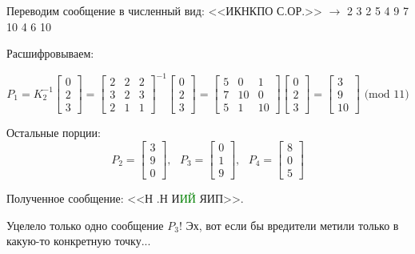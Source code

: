 \documentclass[a4paper,hidelinks,14pt]{extarticle}
\begin{document}
	Переводим сообщение в численный вид: <<ИКНКПО С.ОР.>> $\rightarrow$  2 3 2 5 4 9 7 10 4 6 10
	
	Расшифровываем:
	
		$$
	P_1 = K_2^{-1}\begin{bmatrix}
		0 \\
		2 \\
		3
	\end{bmatrix} =
	\begin{bmatrix}
		2 & 2 & 2 \\
		3 & 2 & 3 \\
		2 & 1 & 1
	\end{bmatrix}^{-1}
	\begin{bmatrix}
		0 \\
		2 \\
		3
	\end{bmatrix}
	=
	\begin{bmatrix}
		5 & 0 & 1 \\
		7 & 10 & 0 \\
		5 & 1  & 10
	\end{bmatrix}
	\begin{bmatrix}
		0 \\
		2 \\
		3
	\end{bmatrix}
	=
	\begin{bmatrix}
		3 \\
		9 \\
		10
	\end{bmatrix} \text{ (mod 11)}
	$$
	
	Остальные порции:
	$$
		P_2 = \begin{bmatrix}
			3 \\
			9 \\
			0
		\end{bmatrix}, \text{ }
		P_3 = \begin{bmatrix}
			0 \\
			1 \\
			9
		\end{bmatrix}, \text{ }
		P_4 = \begin{bmatrix}
			8 \\
			0 \\
			5
		\end{bmatrix}
	$$
	
	Полученное сообщение: <<Н .Н И\textcolor{green}{ИЙ} ЯИП>>.
	
	Уцелело только одно сообщение $P_3$! Эх, вот если бы вредители метили только в какую-то конкретную точку...
	
\end{document}

